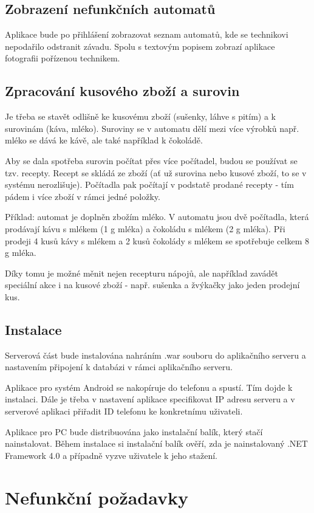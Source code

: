 \documentclass[a4paper,10pt]{article}
\begin{document}
\subsection{Zobrazení nefunkčních automatů}
Aplikace bude po přihlášení zobrazovat seznam automatů, kde se technikovi nepodařilo odstranit závadu. Spolu s textovým popisem zobrazí aplikace fotografii pořízenou technikem.

\subsection{Zpracování kusového zboží a surovin}
Je třeba se stavět odlišně ke kusovému zboží (sušenky, láhve s pitím) a k surovinám (káva, mléko). Suroviny se v automatu dělí mezi více výrobků např. mléko se dává ke kávě, ale také například k čokoládě.

Aby se dala spotřeba surovin počítat přes více počítadel, budou se používat se tzv. recepty. Recept se skládá ze zboží (ať už surovina nebo kusové zboží, to se v systému nerozlišuje). Počítadla pak počítají v podstatě prodané recepty - tím pádem i více zboží v rámci jedné položky.

Příklad: automat je doplněn zbožím mléko. V automatu jsou dvě počítadla, která prodávají kávu s mlékem (1 g mléka) a čokoládu s mlékem (2 g mléka). Při prodeji 4 kusů kávy s mlékem a 2 kusů čokolády s mlékem se spotřebuje celkem 8 g mléka.

Díky tomu je možné měnit nejen recepturu nápojů, ale například zavádět speciální akce i na kusové zboží - např. sušenka a žvýkačky jako jeden prodejní kus.

\subsection{Instalace}
Serverová část bude instalována nahráním .war souboru do aplikačního serveru a nastavením připojení k databázi v rámci aplikačního serveru.

Aplikace pro systém Android se nakopíruje do telefonu a spustí. Tím dojde k instalaci. Dále je třeba v nastavení aplikace specifikovat IP adresu serveru a v serverové aplikaci přiřadit ID telefonu ke konkretnímu uživateli.

Aplikace pro PC bude distribuována jako instalační balík, který stačí nainstalovat. Během instalace si instalační balík ověří, zda je nainstalovaný .NET Framework 4.0 a případně vyzve uživatele k jeho stažení.
\section{Nefunkční požadavky}
\end{document}
